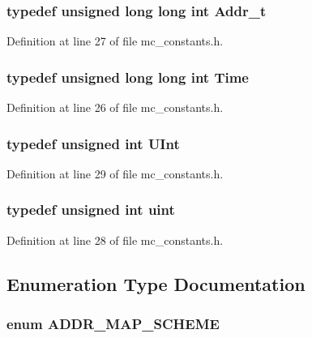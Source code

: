 \subsubsection[{Addr\_\-t}]{\setlength{\rightskip}{0pt plus 5cm}typedef unsigned long long int {\bf Addr\_\-t}}\label{mc__constants_8h_51badf0ffa6471a1e529c69852e56f57}




Definition at line 27 of file mc\_\-constants.h.
\subsubsection[{Time}]{\setlength{\rightskip}{0pt plus 5cm}typedef unsigned long long int {\bf Time}}\label{mc__constants_8h_a475e5c84e5eb0fe317942dc62553f7e}




Definition at line 26 of file mc\_\-constants.h.
\subsubsection[{UInt}]{\setlength{\rightskip}{0pt plus 5cm}typedef unsigned int {\bf UInt}}\label{mc__constants_8h_ba0996d26f7be2572973245b51852757}




Definition at line 29 of file mc\_\-constants.h.
\subsubsection[{uint}]{\setlength{\rightskip}{0pt plus 5cm}typedef unsigned int {\bf uint}}\label{mc__constants_8h_91ad9478d81a7aaf2593e8d9c3d06a14}




Definition at line 28 of file mc\_\-constants.h.

\subsection{Enumeration Type Documentation}
\subsubsection[{ADDR\_\-MAP\_\-SCHEME}]{\setlength{\rightskip}{0pt plus 5cm}enum {\bf ADDR\_\-MAP\_\-SCHEME}}\label{mc__constants_8h_5070e557d1fe0f8dfbfe47ffb8feb753}


